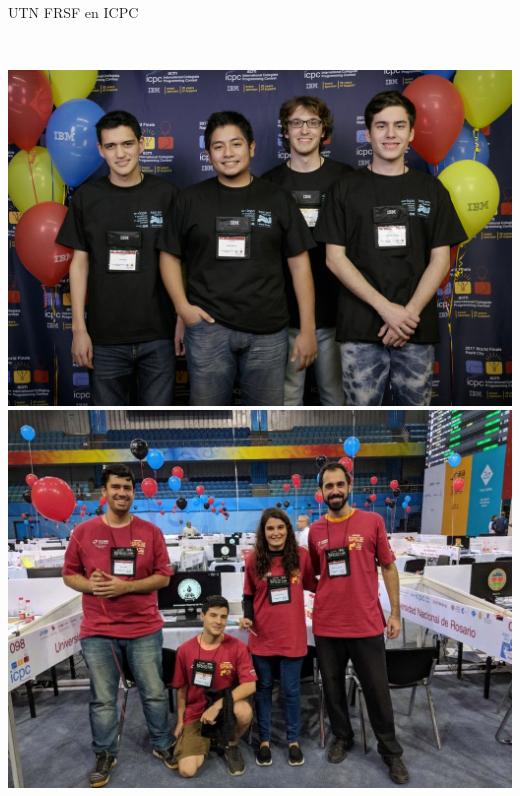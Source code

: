 \documentclass{beamer}
\begin{document}
\begin{frame}{UTN FRSF en ICPC}
    \begin{columns}[t]
        \\
        \includegraphics[width=1\textwidth]{img/2017_usa.jpg}
        \\
        \includegraphics[width=1\textwidth]{img/2018_china.jpeg}
    \end{columns}
\end{frame}
\end{document}
